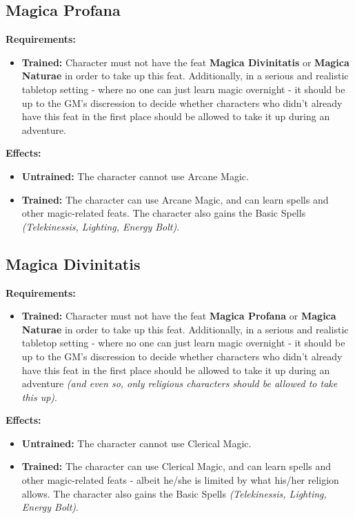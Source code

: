 \documentclass[openany,10pt,a4paper]{book}
\begin{document}
\subsection{Magica Profana}
\begin{table}[!ht]
\centering
{}
\end{table}
\textbf{Requirements:}
\begin{itemize}
	\item \textbf{Trained:} Character must not have the feat \textbf{Magica Divinitatis} or \textbf{Magica Naturae} in order to take up this feat. Additionally, in a serious and realistic tabletop setting - where no one can just learn magic overnight - it should be up to the GM's discression to decide whether characters who didn't already have this feat in the first place should be allowed to take it up during an adventure.
\end{itemize}
\textbf{Effects:}
\begin{itemize}
	\item \textbf{Untrained:} The character cannot use Arcane Magic.
	\item \textbf{Trained:} The character can use Arcane Magic, and can learn spells and other magic-related feats. The character also gains the Basic Spells \textit{(Telekinessis, Lighting, Energy Bolt)}.
\end{itemize}\newpage
\subsection{Magica Divinitatis}
\begin{table}[!ht]
\centering
{}
\end{table}
\textbf{Requirements:}
\begin{itemize}
	\item \textbf{Trained:} Character must not have the feat \textbf{Magica Profana} or \textbf{Magica Naturae} in order to take up this feat. Additionally, in a serious and realistic tabletop setting - where no one can just learn magic overnight - it should be up to the GM's discression to decide whether characters who didn't already have this feat in the first place should be allowed to take it up during an adventure \textit{(and even so, only religious characters should be allowed to take this up)}.
\end{itemize}
\textbf{Effects:}
\begin{itemize}
	\item \textbf{Untrained:} The character cannot use Clerical Magic.
	\item \textbf{Trained:} The character can use Clerical Magic, and can learn spells and other magic-related feats - albeit he/she is limited by what his/her religion allows. The character also gains the Basic Spells \textit{(Telekinessis, Lighting, Energy Bolt)}.
\end{itemize}\newpage
\end{document}
